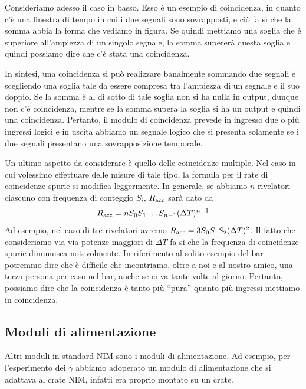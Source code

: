 Consideriamo adesso il caso in basso. Esso è un esempio di coincidenza, in quanto c'è una finestra di tempo in cui i due segnali sono sovrapposti, e ciò fa sì che la somma abbia la forma che vediamo in figura. Se quindi mettiamo una soglia che è superiore all'ampiezza di un singolo segnale, la somma supererà questa soglia e quindi possiamo dire che c'è stata una coincidenza.

In sintesi, una coincidenza si può realizzare banalmente sommando due segnali e scegliendo una soglia tale da essere compresa tra l'ampiezza di un segnale e il suo doppio. Se la somma è al di sotto di tale soglia non si ha nulla in output, dunque non c'è coincidenza, mentre se la somma supera la soglia si ha un output e quindi una coincidenza. Pertanto, il modulo di coincidenza prevede in ingresso due o più ingressi logici e in uscita abbiamo un segnale logico che si presenta solamente se i due segnali presentano una sovrapposizione temporale.

Un ultimo aspetto da considerare è quello delle coincidenze multiple. Nel caso in cui volessimo effettuare delle misure di tale tipo, la formula per il rate di coincidenze spurie si modifica leggermente. In generale, se abbiamo $n$ rivelatori ciascuno con frequenza di conteggio $S_i$, $R_{\rm acc}$ sarà dato da
\begin{equation*}
   R_{\rm acc}
   =n S_0 S_1 \ldots S_{n-1} (\Delta T)^{n-1}
\end{equation*}
Ad esempio, nel caso di tre rivelatori avremo $R_{\rm acc}=3 S_0 S_1 S_2 (\Delta T)^2$. Il fatto che consideriamo via via potenze maggiori di $\Delta T$ fa sì che la frequenza di coincidenze spurie diminuisca notevolmente. In riferimento al solito esempio del bar potremmo dire che è difficile che incontriamo, oltre a noi e al nostro amico, una terza persona per caso nel bar, anche se ci va tante volte al giorno. Pertanto, possiamo dire che la coincidenza è tanto più ``pura'' quanto più ingressi mettiamo in coincidenza.

\vspace{-0.1cm}

\subsection{Moduli di alimentazione}
Altri moduli in standard NIM sono i moduli di alimentazione. Ad esempio, per l'esperimento dei $\gamma$ abbiamo adoperato un modulo di alimentazione che si adattava al crate NIM, infatti era proprio montato su un crate.

